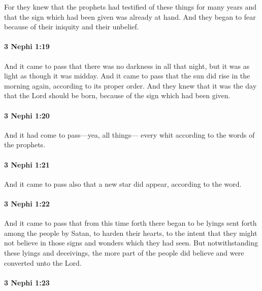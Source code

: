 			For they knew that the prophets had testified of these things for many years
			and that the sign which had been given was already at hand.
			And they began to fear because of their iniquity and their unbelief.

		\paragraph{3 Nephi 1:19} %
			\label{3NEPHI-1-19}

			And it came to pass that there was no darkness in all that night,
			but it was as light as though it was midday.
			And it came to pass that the sun did rise in the morning again,
			according to its proper order.
			And they knew that it was the day that the Lord should be born,
			because of the sign which had been given.

		\paragraph{3 Nephi 1:20} %
			\label{3NEPHI-1-20}

			And it had come to pass---yea, all things---
			every whit according to the words of the prophets.

		\paragraph{3 Nephi 1:21} %
			\label{3NEPHI-1-21}

			And it came to pass also that a new star did appear, according to the word.

		\paragraph{3 Nephi 1:22} %
			\label{3NEPHI-1-22}

			And it came to pass that from this time forth
			there began to be lyings sent forth among the people by Satan,
			to harden their hearts,
			to the intent that they might not believe
			in those signs and wonders which they had seen.
			But notwithstanding these lyings and deceivings,
			the more part of the people did believe and were converted unto the Lord.

		\paragraph{3 Nephi 1:23} %
			\label{3NEPHI-1-23}

